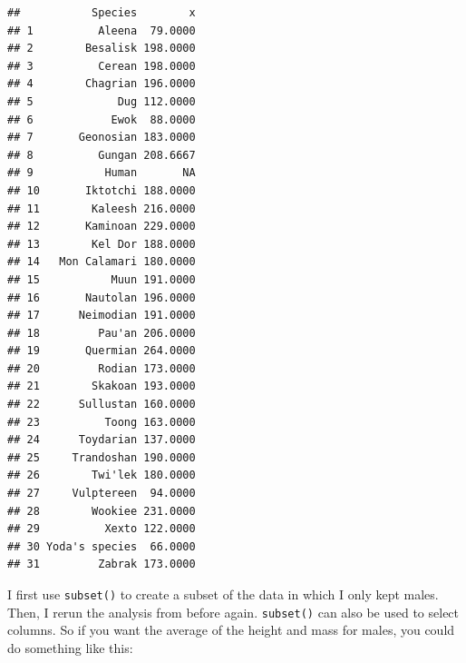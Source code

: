 \documentclass[]{gitbook}
\newenvironment{Shaded}{\begin{snugshade}}{\end{snugshade}}
\newcommand{\DataTypeTok}[1]{\textcolor[rgb]{0.13,0.29,0.53}{#1}}
\newcommand{\KeywordTok}[1]{\textcolor[rgb]{0.13,0.29,0.53}{\textbf{#1}}}
\newcommand{\NormalTok}[1]{#1}
\newcommand{\OperatorTok}[1]{\textcolor[rgb]{0.81,0.36,0.00}{\textbf{#1}}}
\newcommand{\StringTok}[1]{\textcolor[rgb]{0.31,0.60,0.02}{#1}}
\theoremstyle{definition}
\theoremstyle{definition}
\theoremstyle{definition}
\theoremstyle{remark}
\begin{document}
\begin{verbatim}
##           Species        x
## 1          Aleena  79.0000
## 2        Besalisk 198.0000
## 3          Cerean 198.0000
## 4        Chagrian 196.0000
## 5             Dug 112.0000
## 6            Ewok  88.0000
## 7       Geonosian 183.0000
## 8          Gungan 208.6667
## 9           Human       NA
## 10       Iktotchi 188.0000
## 11        Kaleesh 216.0000
## 12       Kaminoan 229.0000
## 13        Kel Dor 188.0000
## 14   Mon Calamari 180.0000
## 15           Muun 191.0000
## 16       Nautolan 196.0000
## 17      Neimodian 191.0000
## 18         Pau'an 206.0000
## 19       Quermian 264.0000
## 20         Rodian 173.0000
## 21        Skakoan 193.0000
## 22      Sullustan 160.0000
## 23          Toong 163.0000
## 24      Toydarian 137.0000
## 25     Trandoshan 190.0000
## 26        Twi'lek 180.0000
## 27     Vulptereen  94.0000
## 28        Wookiee 231.0000
## 29          Xexto 122.0000
## 30 Yoda's species  66.0000
## 31         Zabrak 173.0000
\end{verbatim}

I first use \texttt{subset()} to create a subset of the data in which I
only kept males. Then, I rerun the analysis from before again.
\texttt{subset()} can also be used to select columns. So if you want the
average of the height and mass for males, you could do something like
this:

\begin{Shaded}
\end{Shaded}
\end{document}
